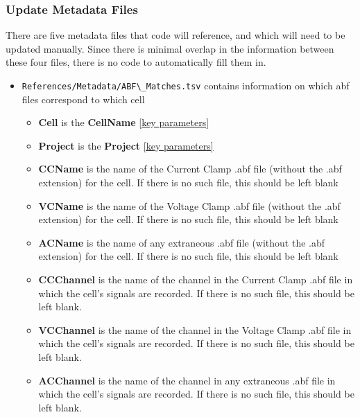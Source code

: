 \documentclass{article}
\begin{document}
\subsubsection{Update Metadata Files}

There are five metadata files that code will reference, and which will need to be updated manually. Since there is minimal overlap in the information between these four files, there is no code to automatically fill them in.
\begin{itemize}
    \item \verb|References/Metadata/ABF\_Matches.tsv| contains information on which abf files correspond to which cell
    \begin{itemize}
        \item \textbf{Cell} is the \textbf{CellName} \ref{key parameters}
        
        \item \textbf{Project} is the \textbf{Project} \ref{key parameters}
        
        \item \textbf{CCName} is the name of the Current Clamp .abf file (without the .abf extension) for the cell. If there is no such file, this should be left blank
        
        \item \textbf{VCName} is the name of the Voltage Clamp .abf file (without the .abf extension) for the cell. If there is no such file, this should be left blank
        
        \item \textbf{ACName} is the name of any extraneous .abf file (without the .abf extension) for the cell.  If there is no such file, this should be left blank
        
        \item \textbf{CCChannel} is the name of the channel in the Current Clamp .abf file in which the cell's signals are recorded. If there is no such file, this should be left blank.
        
        \item \textbf{VCChannel} is the name of the channel in the Voltage Clamp .abf file in which the cell's signals are recorded. If there is no such file, this should be left blank.
        
        \item \textbf{ACChannel} is the name of the channel in any extraneous .abf file in which the cell's signals are recorded. If there is no such file, this should be left blank.
    \end{itemize}
    

\end{itemize}
\end{document}
